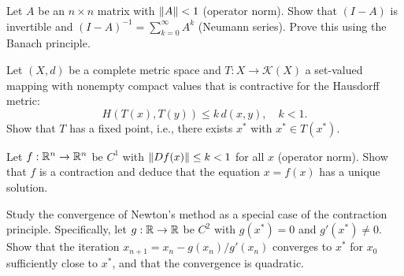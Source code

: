 \begin{exercise}
Let $A$ be an $n \times n$ matrix with $\left\| A \right\| < 1$ (operator norm). Show that
$(I - A)$ is invertible and $(I - A)^{-1} = \sum_{k=0}^\infty A^k$ (Neumann
series). Prove this using the Banach principle.
\end{exercise}

\begin{exercise}
Let $(X, d)$ be a complete metric space and $T : X \to \mathcal{K}(X)$ a
set-valued mapping with nonempty compact values that is contractive for the
Hausdorff metric:
\[
    H(T(x), T(y)) \leq k \, d(x, y), \quad k < 1.
\]
Show that $T$ has a fixed point, i.e., there exists $x^*$ with $x^* \in T(x^*)$.
\end{exercise}

\begin{exercise}
Let $f : \mathbb{R}^n \to \mathbb{R}^n$ be $C^1$ with $\left\| Df(x) \right\| \leq k < 1$ for all $x$
(operator norm). Show that $f$ is a contraction and deduce that the equation
$x = f(x)$ has a unique solution.
\end{exercise}

\begin{exercise}
Study the convergence of Newton's method as a special case of the contraction
principle. Specifically, let $g : \mathbb{R} \to \mathbb{R}$ be $C^2$ with $g(x^*) = 0$ and
$g'(x^*) \neq 0$. Show that the iteration
$x_{n+1} = x_n - g(x_n)/g'(x_n)$ converges to $x^*$ for $x_0$ sufficiently
close to $x^*$, and that the convergence is quadratic.
\end{exercise}
